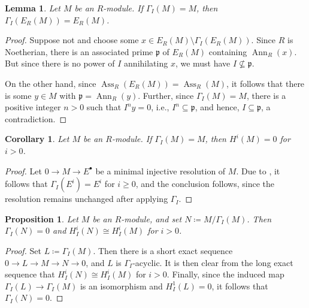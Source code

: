 \documentclass[10pt]{article}
\theoremstyle{thmstyle}
\newtheorem{lemma}[theorem]{Lemma}
\newtheorem{proposition}[theorem]{Proposition}
\theoremstyle{defstyle}
\newtheorem{corollary}[theorem]{Corollary}
\newcommand{\Ann}{\operatorname{Ann}}
\newcommand{\frakp}{\mathfrak{p}} %
\renewcommand{\ge}{\geqslant}
\newcommand{\Ass}{\operatorname{Ass}}
\begin{document}
\begin{lemma}
	Let $M$ be an $R$-module. If $\Gamma_I(M) = M$, then $\Gamma_I(E_R(M)) = E_R(M)$.
\end{lemma}
\begin{proof}
	Suppose not and choose some $x\in E_R(M)\setminus\Gamma_I(E_R(M))$. Since $R$ is Noetherian, there is an associated prime $\frakp$ of $E_R(M)$ containing $\Ann_R(x)$. But since there is no power of $I$ annihilating $x$, we must have $I\not\subseteq\frakp$.

	On the other hand, since $\Ass_R(E_R(M)) = \Ass_R(M)$, it follows that there is some $y\in M$ with $\frakp = \Ann_R(y)$. Further, since $\Gamma_I(M) = M$, there is a positive integer $n > 0$ such that $I^ny = 0$, i.e., $I^n\subseteq\frakp$, and hence, $I\subseteq\frakp$, a contradiction.
\end{proof}

\begin{corollary}
	Let $M$ be an $R$-module. If $\Gamma_I(M) = M$, then $H^i(M) = 0$ for $i > 0$.
\end{corollary}
\begin{proof}
	Let $0\to M\to E^\bullet$ be a minimal injective resolution of $M$. Due to , it follows that $\Gamma_I(E^i) = E^i$ for $i\ge 0$, and the conclusion follows, since the resolution remains unchanged after applying $\Gamma_I$.
\end{proof}

\begin{proposition}
	Let $M$ be an $R$-module, and set $N\coloneq M/\Gamma_I(M)$. Then $\Gamma_I(N) = 0$ and $H^i_I(N)\cong H^i_I(M)$ for $i > 0$.
\end{proposition}
\begin{proof}
	Set $L\coloneq\Gamma_I(M)$. Then there is a short exact sequence $0\to L\to M\to N\to 0$, and $L$ is $\Gamma_I$-acyclic. It is then clear from the long exact sequence that $H^i_I(N)\cong H^i_I(M)$ for $i > 0$. Finally, since the induced map $\Gamma_I(L)\to\Gamma_I(M)$ is an isomorphism and $H^1_I(L) = 0$, it follows that $\Gamma_I(N) = 0$.
\end{proof}
\end{document}
